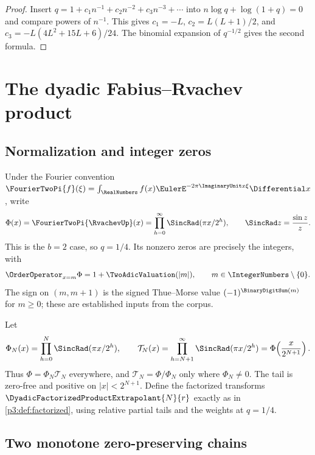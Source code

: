 \documentclass[11pt]{article}
\numberwithin{equation}{section}
\theoremstyle{definition}
\theoremstyle{remark}
\begin{document}
\begin{proof}
Insert $q=1+c_1n^{-1}+c_2n^{-2}+c_3n^{-3}+\cdots$ into
$n\log q+\log(1+q)=0$ and compare powers of $n^{-1}$.  This gives
$c_1=-L$, $c_2=L(L+1)/2$, and $c_3=-L(4L^2+15L+6)/24$.
The binomial expansion of $q^{-1/2}$ gives the second formula.
\end{proof}

\section{The dyadic Fabius--Rvachev product}\label{p3:sec:dyadic}

\subsection{Normalization and integer zeros}

Under the Fourier convention
$\FourierTwoPi{f}(\xi)=\int_{\RealNumbers}f(x)\EulerE^{-2\pi\ImaginaryUnit x\xi}\Differential x$, write
\begin{equation}
 \Phi(x)=\FourierTwoPi{\RvachevUp}(x)
 =\prod_{h=0}^{\infty}\SincRad(\pi x/2^h),
 \qquad \SincRad z=\frac{\sin z}{z}.
 \label{p3:eq:Phi}
\end{equation}
This is the $b=2$ case, so $q=1/4$.  Its nonzero zeros are precisely the integers, with
\begin{equation}
 \OrderOperator_{x=m}\Phi=1+\TwoAdicValuation(|m|),\qquad m\in\IntegerNumbers\setminus\{0\}.
 \label{p3:eq:integer-multiplicity}
\end{equation}
The sign on $(m,m+1)$ is the signed Thue--Morse value $(-1)^{\BinaryDigitSum(m)}$ for $m\ge0$;
these are established inputs from the corpus.

Let
\begin{equation}
 \Phi_N(x)=\prod_{h=0}^{N}\SincRad(\pi x/2^h),
 \qquad
 \mathcal T_N(x)=\prod_{h=N+1}^{\infty}\SincRad(\pi x/2^h)
 =\Phi\!\left(\frac{x}{2^{N+1}}\right).
 \label{p3:eq:Phi-prefix-tail}
\end{equation}
Thus $\Phi=\Phi_N\mathcal T_N$ everywhere, and
$\mathcal T_N=\Phi/\Phi_N$ only where $\Phi_N\ne0$.  The tail is zero-free and positive on
$|x|<2^{N+1}$.  Define the factorized transforms
$\DyadicFactorizedProductExtrapolant{N}{r}$ exactly as in \cref{p3:def:factorized}, using relative partial tails and
the weights at $q=1/4$.

\subsection{Two monotone zero-preserving chains}
\end{document}
